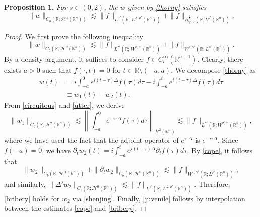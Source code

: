 \documentclass[preprint,compress,12pt]{elsarticle}
\newtheorem{proposition}[theorem]{Proposition}
\numberwithin{equation}{section}
\begin{document}
\begin{proposition}
	For $s\in(0,2)$, the $w$ given by \eqref{thorny} satisfies
	\begin{equation}\label{juvenile}
		\|w\|_{C_{b}(\mathbb{R};\mathcal{H}^{s}(\mathbb{R}^{n}))}\lesssim \|f\|_{L^{\gamma'}(\mathbb{R};W^{s,\rho'}(\mathbb{R}^{n}))}+\|f\|_{B^{\frac{s}{2}}_{\gamma',2}(\mathbb{R};L^{\rho'}(\mathbb{R}^{n}))}.
	\end{equation}
\end{proposition}
\begin{proof}
	We first prove the following inequality
	\begin{equation}\label{bribery}	\|w\|_{C_{b}(\mathbb{R};\mathcal{H}^{2}(\mathbb{R}^{n}))}\lesssim\|f\|_{L^{\gamma'}(\mathbb{R};W^{2,\rho'}(\mathbb{R}^{n}))}+\|f\|_{W^{1,\gamma'}(\mathbb{R};L^{\rho'}(\mathbb{R}^{n}))}.
	\end{equation}
	By a density argument, it suffices to consider $f\in C_{c}^{\infty}(\mathbb{R}^{n+1})$. Clearly,  there exists $a>0$ such that $f(\cdot,t)=0$ for $t\in\mathbb{R}\setminus(-a,a)$. We decompose \eqref{thorny} as
	\begin{equation*}
		\begin{aligned}
			w(t)&=i\int_{-a}^{0}e^{i(t-\tau)\Delta} f(\tau) d\tau-i\int_{-a}^{t}e^{i(t-\tau)\Delta}f(\tau)d\tau \\
			&\equiv w_{1}(t)-w_{2}(t).
		\end{aligned}
	\end{equation*}
	From \eqref{circuitous} and \eqref{utter}, we derive
	\begin{equation*}  \|w_{1}\|_{C_{b}(\mathbb{R};\mathcal{H}^{2}(\mathbb{R}^{n}))}\lesssim \left\|\int_{-a}^{0} e^{-i\tau\Delta} f(\tau)d\tau\right\|_{H^{2}(\mathbb{R}^{n})}\lesssim \|f\|_{L^{\gamma'}(\mathbb{R};W^{2,\rho'}(\mathbb{R}^{n}) )},
	\end{equation*}
	where we have used the fact that the adjoint operator of $e^{i\tau\Delta}$ is $e^{-i\tau\Delta}$. Since $f(-a)=0$, we have $\partial_{t}w_{2}(t)=i\int_{-a}^{t}e^{i(t-\tau)\Delta}\partial_{t}f(\tau)d\tau$. By \eqref{cope}, it follows that
	\begin{equation*}
		\|w_{2}\|_{C_{b}(\mathbb{R};\mathcal{H}^{0}(\mathbb{R}^{n}))}+\|\partial_{t}w_{2}\|_{C_{b}(\mathbb{R};\mathcal{H}^{0}(\mathbb{R}^{n}))}\lesssim \|f\|_{W^{1,\gamma'}(\mathbb{R};L^{\rho'}(\mathbb{R}^{n}))},
	\end{equation*}
	and similarly, $\|\Delta'w_{2}\|_{C_{b}(\mathbb{R};\mathcal{H}^{0}(\mathbb{R}^{n}))}\lesssim \|f\|_{L^{\gamma'}(\mathbb{R};W^{2,\rho'}(\mathbb{R}^{n}))}$.
	Therefore, \eqref{bribery} holds for $w_{2}$  via \eqref{shenjing}. Finally, \eqref{juvenile} follows by interpolation between the estimates \eqref{cope} and \eqref{bribery}.
\end{proof}	
\end{document}
